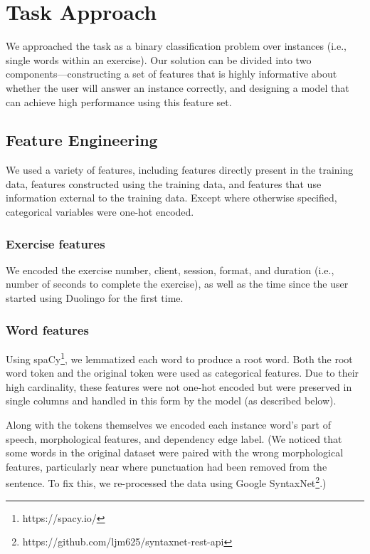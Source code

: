 \documentclass[11pt,a4paper]{article}
\begin{document}
\section{Task Approach}

We approached the task as a binary classification problem over instances (i.e.,
single words within an exercise). Our solution can be divided into two
components---constructing a set of features that is highly informative about
whether the user will answer an instance correctly, and designing a model that
can achieve high performance using this feature set.

\subsection{Feature Engineering}

We used a variety of features, including features directly present in the
training data, features constructed using the training data, and features that
use information external to the training data. Except where otherwise specified,
categorical variables were one-hot encoded.

\subsubsection{Exercise features}

We encoded the exercise number, client, session, format, and duration (i.e., number of
seconds to complete the exercise), as well as the time since the user started using Duolingo for the first time.

\subsubsection{Word features}

Using spaCy\footnote{https://spacy.io/}, we lemmatized each word to produce a root word. Both the root
word token and the original token were used as categorical features. Due to
their high cardinality, these features were not one-hot encoded but were
preserved in single columns and handled in this form by the model (as described
below).

Along with the tokens themselves we encoded each instance word's part of speech,
morphological features, and dependency edge label. (We noticed that some words
in the original dataset were paired with the wrong morphological features,
particularly near where punctuation had been removed from the sentence. To fix
this, we re-processed the data using Google SyntaxNet\footnote{https://github.com/ljm625/syntaxnet-rest-api}.)
\end{document}
